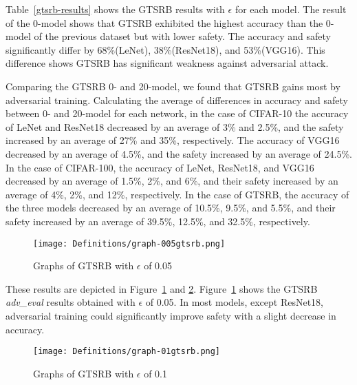 \documentclass[symmetry,article,submit,moreauthors,pdftex]{Definitions/mdpi}
\begin{document}
Table~\ref{gtsrb-results} shows the GTSRB results with \begin{math}\epsilon\end{math} for each model.
The result of the 0-model shows that GTSRB exhibited the highest accuracy than the 0-model of the previous dataset but with lower safety. 
The accuracy and safety significantly differ by 68\%(LeNet), 38\%(ResNet18), and 53\%(VGG16).
This difference shows GTSRB has significant weakness against adversarial attack.

Comparing the GTSRB 0- and 20-model, we found that GTSRB gains most by adversarial training. 
Calculating the average of differences in accuracy and safety between 0- and 20-model for each network,
in the case of CIFAR-10 the accuracy of LeNet and ResNet18 decreased by an average of 3\% and 2.5\%, and the safety increased by an average of 27\% and 35\%, respectively. The accuracy of VGG16 decreased by an average of 4.5\%, and the safety increased by an average of 24.5\%.
In the case of CIFAR-100, the accuracy of LeNet, ResNet18, and VGG16 decreased by an average of 1.5\%, 2\%, and 6\%, and their safety increased by an average of 4\%, 2\%, and 12\%, respectively.
In the case of GTSRB, the accuracy of the three models decreased by an average of 10.5\%, 9.5\%, and 5.5\%, and their safety increased by an average of 39.5\%, 12.5\%, and 32.5\%, respectively.


\begin{figure}[H]
    \texttt{[image: Definitions/graph-005gtsrb.png]}
    \caption{Graphs of GTSRB with \begin{math}\epsilon\end{math} of 0.05\label{gtsrb-0.05-graph}}
\end{figure} 

These results are depicted in Figure~\ref{gtsrb-0.05-graph} and \ref{gtsrb-0.1-graph}.
Figure~\ref{gtsrb-0.05-graph} shows the GTSRB {\it adv\_eval} results obtained with \begin{math}\epsilon\end{math} of 0.05.
In most models, except ResNet18, adversarial training could significantly improve safety with a slight decrease in accuracy.

\begin{figure}[H]
    \texttt{[image: Definitions/graph-01gtsrb.png]}
    \caption{Graphs of GTSRB with \begin{math}\epsilon\end{math} of 0.1\label{gtsrb-0.1-graph}}
\end{figure} 
\end{document}
